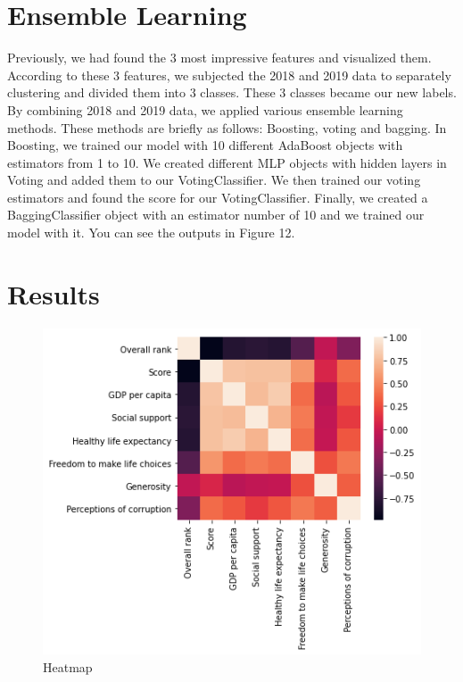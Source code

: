 \documentclass[onecolumn]{article}
\begin{document}
\section{Ensemble Learning}
Previously, we had found the 3 most impressive features and visualized them. According to these 3 features, we subjected the 2018 and 2019 data to separately clustering and divided them into 3 classes. These 3 classes became our new labels. By combining 2018 and 2019 data, we applied various ensemble learning methods. These methods are briefly as follows: Boosting, voting and bagging. In Boosting, we trained our model with 10 different AdaBoost objects with estimators from 1 to 10. We created different MLP objects with hidden layers in Voting and added them to our VotingClassifier. We then trained our voting estimators and found the score for our VotingClassifier. Finally, we created a BaggingClassifier object with an estimator number of 10 and we trained our model with it. You can see the outputs in Figure 12.



\section{Results}

\begin{figure}[htp]
\centering
\includegraphics[scale=0.40]{heatmap.png}
\caption{Heatmap}
\end{figure}
\end{document}
